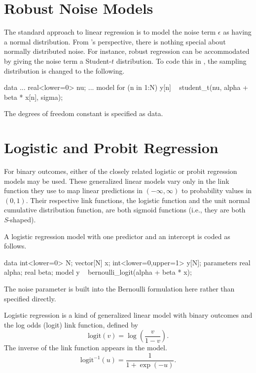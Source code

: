 \section{Robust Noise Models}

The standard approach to linear regression is to model the noise
term $\epsilon$ as having a normal distribution.  From \Stan's
perspective, there is nothing special about normally distributed
noise.  For instance, robust regression can be accommodated by giving
the noise term a Student-$t$ distribution.  To code this in \Stan, the
sampling distribution is changed to the following.
%

\begin{stancode}
data {
  ...
  real<lower=0> nu;
}
...
model {
  for (n in 1:N)
    y[n] ~ student_t(nu, alpha + beta * x[n], sigma);
}
\end{stancode}
%
The degrees of freedom constant  is specified as data.

\section{Logistic and Probit Regression}\label{logistic-probit-regression.section}

For binary outcomes, either of the closely related logistic or probit
regression models may be used.  These generalized linear models vary
only in the link function they use to map linear predictions in
$(-\infty,\infty)$ to probability values in $(0,1)$.  Their respective
link functions, the logistic function and the unit normal cumulative distribution
function, are both sigmoid functions (i.e., they are both {\it S}-shaped).

A logistic regression model with one predictor and an intercept is coded as
follows.
%

\begin{stancode}
data {
  int<lower=0> N;
  vector[N] x;
  int<lower=0,upper=1> y[N];
}
parameters {
  real alpha;
  real beta;
}
model {
  y ~ bernoulli_logit(alpha + beta * x);
} 
\end{stancode}
%
The noise parameter is built into the Bernoulli formulation here
rather than specified directly.  

Logistic regression is a kind of generalized linear model with binary
outcomes and the log odds (logit) link function, defined by
%
\[
\mbox{logit}(v) = \log \left( \frac{v}{1-v} \right).
\]
%
The inverse of the link function appears in the model.  
%
\[
\mbox{logit}^{-1}(u) = \frac{1}{1 + \exp(-u)}.
\]
%

